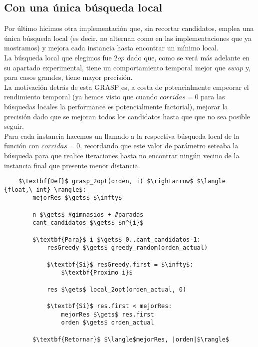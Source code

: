 \subsection{Con una única búsqueda local}
Por último hicimos otra implementación que, sin recortar candidatos, emplea una única búsqueda local (es decir, no alternan como en las implementaciones que ya mostramos) y mejora cada instancia hasta encontrar un mínimo local.
\\

La búsqueda local que elegimos fue $2op$ dado que, como se verá más adelante en su apartado experimental, tiene un comportamiento temporal mejor que $swap$ y, para casos grandes, tiene mayor precisión.
\\

La motivación detrás de esta GRASP es, a costa de potencialmente empeorar el rendimiento temporal (ya hemos visto que cuando $corridas=0$ para las búsquedas locales la performance es potencialmente factorial), mejorar la precisión dado que se mejoran todos los candidatos hasta que que no sea posible seguir.
\\

Para cada instancia hacemos un llamado a la respectiva búsqueda local de la función con $corridas=0$, recordando que este valor de parámetro seteaba la búsqueda para que realice iteraciones hasta no encontrar ningún vecino de la instancia final que presente menor distancia.
\\


\begin{lstlisting}
    $\textbf{Def}$ grasp_2opt(orden, i) $\rightarrow$ $\langle {float,\ int} \rangle$:
        mejorRes $\gets$ $\infty$

        n $\gets$ #gimnasios + #paradas
        cant_candidatos $\gets$ $n^{i}$

        $\textbf{Para}$ i $\gets$ 0..cant_candidatos-1:
            resGreedy $\gets$ greedy_random(orden_actual)

            $\textbf{Si}$ resGreedy.first = $\infty$:
                $\textbf{Proximo i}$

            res $\gets$ local_2opt(orden_actual, 0)

            $\textbf{Si}$ res.first < mejorRes:
                mejorRes $\gets$ res.first
                orden $\gets$ orden_actual

        $\textbf{Retornar}$ $\langle$mejorRes, |orden|$\rangle$
\end{lstlisting}
